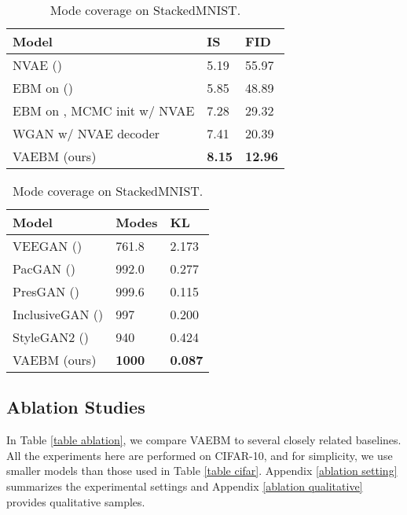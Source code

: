 \documentclass{article} \usepackage{iclr2021_conference,times}
\begin{document}
\begin{table}
\small
\begin{minipage}{.49\linewidth}
    \centering

\caption{Comparison for IS and FID on CIFAR-10 between several related training methods.}
\label{table ablation}
\begin{tabular}{lll}
Model & IS & FID
\\ \hline
NVAE (\citeauthor{vahdat2020nvae})  & 5.19 & 55.97\\
EBM on  (\citeauthor{du2019implicit}) & 5.85 & 48.89 \\
EBM on , MCMC init w/ NVAE & 7.28 & 29.32\\
WGAN w/ NVAE decoder & 7.41 & 20.39 \\
VAEBM (ours) & \textbf{8.15} & \textbf{12.96}\\
\hline
\end{tabular}
\end{minipage}\hfill
\begin{minipage}{.49\linewidth}
    \centering
 \caption{Mode coverage on StackedMNIST. }
\label{table stackedmnist}
\begin{tabular}{lll}
Model & Modes  & KL
\\ \hline
VEEGAN (\citeauthor{srivastava2017veegan}) & 761.8 & 2.173\\
PacGAN (\citeauthor{lin2018pacgan}) & 992.0  & 0.277\\
PresGAN (\citeauthor{dieng2019prescribed}) & 999.6  & 0.115 \\
InclusiveGAN (\citeauthor{yu2020inclusive}) & 997 & 0.200  \\
StyleGAN2 (\citeauthor{karras2020analyzing}) & 940 & 0.424 \\
\hline
VAEBM (ours) & \textbf{1000} & \textbf{0.087} \\
\hline
\end{tabular}
\end{minipage}
\end{table}

\subsection{Ablation Studies}\label{ablation}
In Table \ref{table ablation}, we compare VAEBM to several closely related baselines. All the experiments here are performed on CIFAR-10, and for simplicity, we use smaller models than those used in Table \ref{table cifar}. Appendix \ref{ablation setting} summarizes the experimental settings and 
Appendix \ref{ablation qualitative} provides qualitative samples.
\end{document}
